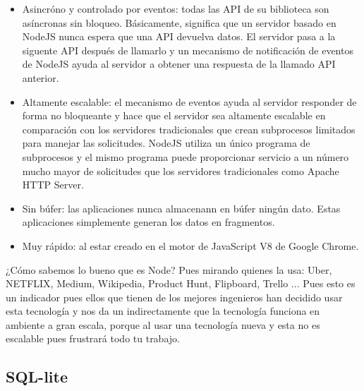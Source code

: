 \documentclass[a4paper, 11pt]{article}
\begin{document}
\begin{itemize}
          \begin{itemize}
            \item{Asincróno y controlado por eventos: todas las API de su
                  biblioteca son asíncronas sin bloqueo. Básicamente, significa
                  que un servidor basado en NodeJS nunca espera que una API
                  devuelva datos. El servidor pasa a la siguente API después de
                  llamarlo y un mecanismo de notificación de eventos de NodeJS
                  ayuda al servidor a obtener una respuesta de la llamado API
                  anterior.}
            \item{Altamente escalable: el mecanismo de eventos ayuda al servidor
                  responder de forma no bloqueante y hace que el servidor sea
                  altamente escalable en comparación con los servidores
                  tradicionales que crean subprocesos limitados para manejar las
                  solicitudes. NodeJS utiliza un único programa de subprocesos y
                  el mismo programa puede proporcionar servicio a un número mucho
                  mayor de solicitudes que los servidores tradicionales como
                  Apache HTTP Server.}
            \item{Sin búfer: las aplicaciones nunca almacenann en búfer ningún
                  dato. Estas aplicaciones simplemente generan los datos en
                  fragmentos.}
            \item{Muy rápido: al estar creado en el motor de JavaScript V8 de
                  Google Chrome.}
          \end{itemize}


          ¿Cómo sabemos lo bueno que es Node? Pues mirando quienes la usa: Uber,
          NETFLIX, Medium, Wikipedia, Product Hunt, Flipboard, Trello ... Pues
          esto es un indicador pues ellos que tienen de los mejores ingenieros
          han decidido usar esta tecnología y nos da un indirectamente que la
          tecnología funciona en ambiente a gran escala, porque al usar una
          tecnología nueva y esta no es escalable pues frustrará todo tu trabajo.\\

        \subsection{SQL-lite}\\


\end{itemize}
\end{document}
